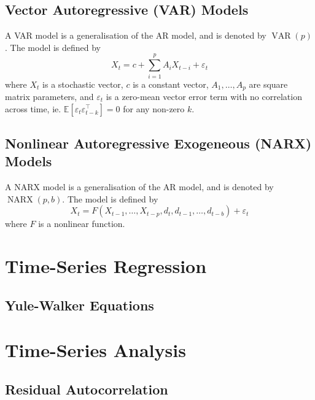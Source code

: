 \documentclass[11pt]{report} %
\begin{document}
\subsection{Vector Autoregressive (VAR) Models}
A VAR model is a generalisation of the AR model, and is denoted by  $\operatorname{VAR}\left(p\right)$. The model is defined by
\begin{equation}
X_{t} = c + \sum_{i = 1}^{p}A_{i}X_{t - i} + \varepsilon_{t}
\end{equation}
where $X_{t}$ is a stochastic vector, $c$ is a constant vector, $A_{1}, \dots, A_{p}$ are square matrix parameters, and $\varepsilon_{t}$ is a zero-mean vector error term with no correlation across time, ie. $\mathbb{E}\left[\varepsilon_{t}\varepsilon_{t - k}^{\top}\right] = 0$ for any non-zero $k$.

\subsection{Nonlinear Autoregressive Exogeneous (NARX) Models}
A NARX model is a generalisation of the AR model, and is denoted by $\operatorname{NARX}\left(p, b\right)$. The model is defined by
\begin{equation}
X_{t} = F\left(X_{t - 1}, \dots, X_{t - p}, d_{t}, d_{t - 1}, \dots, d_{t - b}\right) + \varepsilon_{t}
\end{equation}
where $F$ is a nonlinear function.

\section{Time-Series Regression}

\subsection{Yule-Walker Equations}

\section{Time-Series Analysis}

\subsection{Residual Autocorrelation}
\end{document}
